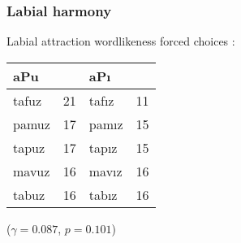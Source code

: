 \subsubsection{Labial harmony}

Labial attraction wordlikeness forced choices \citep[314]{Zimmer1969}: \vspace{6pt} \\ 
\begin{tabular}{l r l r}
\toprule
\multicolumn{2}{l}{aPu} & \multicolumn{2}{l}{aPı} \\
\midrule
tafuz & 21              & tafız & 11 \\
pamuz & 17              & pamız & 15 \\
tapuz & 17              & tapız & 15 \\
mavuz & 16              & mavız & 16 \\
tabuz & 16              & tabız & 16 \\
\bottomrule
\end{tabular}

($\gamma = 0.087$, $p = 0.101$)
